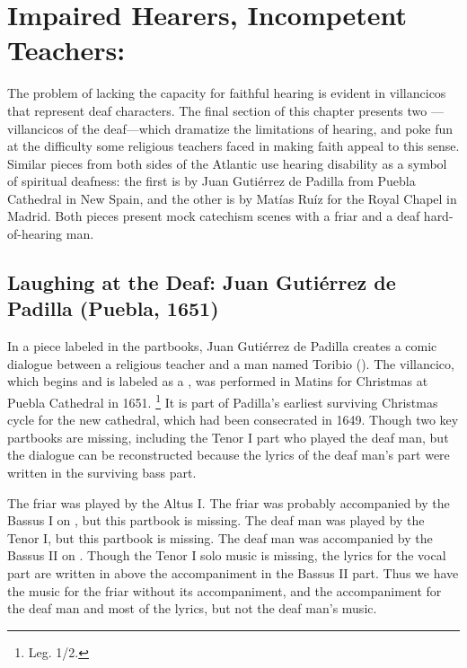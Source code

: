 \section{Impaired Hearers, Incompetent Teachers: }

The problem of lacking the capacity for faithful hearing is evident in
villancicos that represent deaf characters.
The final section of this chapter presents two ---villancicos of the deaf---which dramatize the limitations of hearing, and poke fun at the difficulty some religious teachers faced in making faith appeal to this sense.
Similar pieces from both sides of the Atlantic use hearing disability as a symbol of spiritual deafness: the first is by Juan Gutiérrez de Padilla from Puebla Cathedral in New Spain, and the other is by Matías Ruíz for the Royal Chapel in Madrid.
Both pieces present mock catechism scenes with a friar and a deaf hard-of-hearing man.

\subsection{Laughing at the Deaf: Juan Gutiérrez de Padilla (Puebla, 1651)}

In a piece labeled  in the partbooks, Juan Gutiérrez de Padilla creates a comic dialogue between a religious teacher and a  man named Toribio ().
The villancico, which begins  and is labeled as a , was performed in Matins for Christmas at Puebla Cathedral in 1651.%
\footnote{\signature{MEX-Pc}{Leg. 1/2}.}
It is part of Padilla's earliest surviving Christmas cycle for the new cathedral, which had been consecrated in 1649.
Though two key partbooks are missing, including the Tenor I part who played the deaf man, but the dialogue can be reconstructed because the lyrics of the deaf man's part were written in the surviving bass part.%
\begin{Footnote}
    The friar was played by the Altus I. 
    The friar was probably accompanied by the Bassus I on , but this partbook is missing.
    The deaf man was played by the Tenor I, but this partbook is missing.
    The deaf man was accompanied by the Bassus II on .
    Though the Tenor I solo music is missing, the lyrics for the vocal part are written in above the accompaniment in the Bassus II part. 
    Thus we have the music for the friar without its accompaniment, and the accompaniment for the deaf man and most of the lyrics, but not the deaf man's music.
\end{Footnote}


